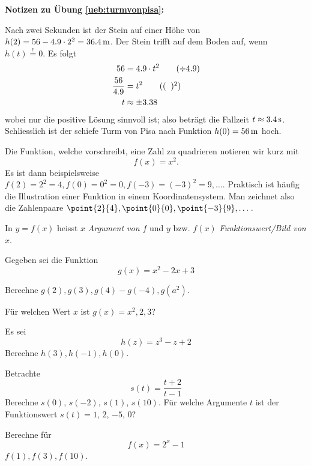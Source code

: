 \documentclass[%
11pt,%
twoside,%
titlepage,%
german,%
headsepline%
]{scrartcl}
\newcommand{\concatueb}[1]{ueb:#1}%
\newcommand{\concatlsg}[1]{lsg:#1}%
\newenvironment{lsg}[1]{%
    \par\noindent\textbf{Notizen zu Übung \ref{\concatueb{#1}}:}%
    \label{\concatlsg{#1}}\par
}{%
    \par%
}
\begin{document}
\begin{lsg}{turmvonpisa}
	Nach zwei Sekunden ist der Stein auf einer H\"ohe von $h(2)=56-4.9\cdot2^{2}=\unit[36.4]{m}$. Der Stein trifft auf dem Boden auf, wenn $h(t)\stackrel{!}{=}0$. Es folgt
	\begin{align*}
		56&=4.9\cdot t^{2}\tag{$\div4.9$}\\
		\frac{56}{4.9} &= t^{2}\tag{$(\phantom{x})^{2}$}\\
		t &\approx \pm3.38
	\end{align*}
	wobei nur die positive L\"osung sinnvoll ist; also betr\"agt die Fallzeit $t\approx\unit[3.4]{s}$. Schliesslich ist der schiefe Turm von Pisa nach Funktion $h(0)=\unit[56]{m}$ hoch.
\end{lsg}

\begin{bsp}
Die Funktion, welche vorschreibt, eine Zahl zu quadrieren notieren wir kurz mit
$$f(x)=x^2.$$
Es ist dann beispielsweise $f(2)=2^2=4, f(0)=0^2=0, f(-3)=(-3)^2=9,\dots$. Praktisch ist h\"aufig die Illustration einer Funktion in einem Koordinatensystem. Man zeichnet also die Zahlenpaare $\point{2}{4}, \point{0}{0}, \point{-3}{9},\dots$.
\end{bsp}
\begin{bem}
In $y=f(x)$ heisst $x$ \emph{Argument von $f$} und $y$ bzw. $f(x)$ \emph{Funktionswert/Bild von $x$}.
\end{bem}
\begin{ueb}[Schreibweise]
Gegeben sei die Funktion
$$g(x)=x^2-2x+3$$
\begin{enumeratea}
\item Berechne $g(2),g(3),g(4)-g(-4),g(a^2)$.
\item F\"ur welchen Wert $x$ ist $g(x)=x^2,2,3$?
\end{enumeratea}
\end{ueb}
\begin{ueb}[Schreibweise 2]
Es sei
$$h(z)=z^3-z+2$$
Berechne $h(3),h(-1),h(0)$.
\end{ueb}
\begin{ueb}[Schreibweise 3]
Betrachte
$$s(t)=\frac{t+2}{t-1}$$
Berechne $s(0)$, $s(-2)$, $s(1)$, $s(10)$. F\"ur welche Argumente $t$ ist der Funktionswert $s(t)=1$, $2$, $-5$, $0$?
\end{ueb}
\begin{ueb}[Schreibweise 4]
Berechne f\"ur
$$f(x)=2^x-1$$
$f(1),f(3),f(10)$.
\end{ueb}
\end{document}
